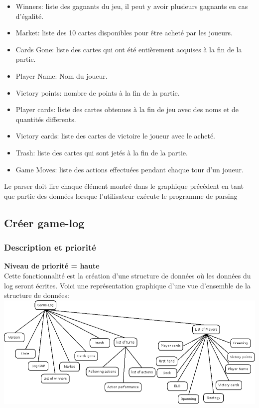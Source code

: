 \documentclass{scrreprt}
\begin{document}
\begin{itemize}
\item Winners: liste des gagnants du jeu, il peut y avoir plusieurs gagnants en cas d'égalité.
\item Market: liste des 10 cartes disponibles pour être acheté par les joueurs.
\item Cards Gone: liste des cartes qui ont été entièrement acquises à la fin de la partie.
\item Player Name: Nom du joueur.
\item Victory points: nombre de points à la fin de la partie.
\item Player cards: liste des cartes obtenues à la fin de jeu avec des noms et de quantités differents.
\item Victory cards: liste des cartes de victoire le joueur avec le acheté.
\item Trash: liste des cartes qui sont jetés à la fin de la partie.
\item Game Moves: liste des actions effectuées pendant chaque tour d'un joueur.
\end{itemize}
Le parser doit lire chaque élément montré dans le graphique précédent en tant que partie des données lorsque l'utilisateur exécute le programme de parsing\\

\subsection{Créer game-log}
\subsubsection{Description et priorité}
\textbf{Niveau de priorité = haute}\\
Cette fonctionnalité est la création d'une structure de données où les données du log seront écrites.
Voici une représentation graphique d'une vue d'ensemble de la structure de données:\\
\includegraphics[scale=0.5,keepaspectratio]{diaRessources/game-log}
\end{document}
